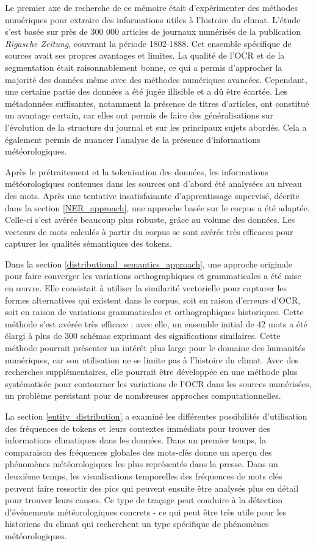 \documentclass[a4paper,twoside,12pt]{article}
\begin{document}
Le premier axe de recherche de ce mémoire était d'expérimenter des méthodes numériques pour extraire des informations utiles à l'histoire du climat. L'étude s'est basée sur près de 300 000 articles de journaux numérisés de la publication \textit{Rigasche Zeitung}, couvrant la période 1802-1888. Cet ensemble spécifique de sources avait ses propres avantages et limites. La qualité de l'OCR et de la segmentation était raisonnablement bonne, ce qui a permis d'approcher la majorité des données même avec des méthodes numériques avancées. Cependant, une certaine partie des données a été jugée illisible et a dû être écartée. Les métadonnées suffisantes, notamment la présence de titres d'articles, ont constitué un avantage certain, car elles ont permis de faire des généralisations sur l'évolution de la structure du journal et sur les principaux sujets abordés. Cela a également permis de nuancer l'analyse de la présence d'informations météorologiques.

Après le prétraitement et la tokenisation des données, les informations météorologiques contenues dans les sources ont d'abord été analysées au niveau des mots. Après une tentative insatisfaisante d'apprentissage supervisé, décrite dans la section \ref{NER_approach}, une approche basée sur le corpus a été adaptée. Celle-ci s'est avérée beaucoup plus robuste, grâce au volume des données. Les vecteurs de mots calculés à partir du corpus se sont avérés très efficaces pour capturer les qualités sémantiques des tokens.

Dans la section \ref{distributional_semantics_approach}, une approche originale pour faire converger les variations orthographiques et grammaticales a été mise en œuvre. Elle consistait à utiliser la similarité vectorielle pour capturer les formes alternatives qui existent dans le corpus, soit en raison d'erreurs d'OCR, soit en raison de variations grammaticales et orthographiques historiques. Cette méthode s'est avérée très efficace : avec elle, un ensemble initial de 42 mots a été élargi à plus de 300 schémas exprimant des significations similaires. Cette méthode pourrait présenter un intérêt plus large pour le domaine des humanités numériques, car son utilisation ne se limite pas à l'histoire du climat. Avec des recherches supplémentaires, elle pourrait être développée en une méthode plus systématisée pour contourner les variations de l'OCR dans les sources numérisées, un problème persistant pour de nombreuses approches computationnelles.

La section \ref{entity_distribution} a examiné les différentes possibilités d'utilisation des fréquences de tokens et leurs contextes immédiats pour trouver des informations climatiques dans les données. Dans un premier temps, la comparaison des fréquences globales des mots-clés donne un aperçu des phénomènes météorologiques les plus représentés dans la presse. Dans un deuxième temps, les visualisations temporelles des fréquences de mots clés peuvent faire ressortir des pics qui peuvent ensuite être analysés plus en détail pour trouver leurs causes. Ce type de traçage peut conduire à la détection d'événements météorologiques concrets - ce qui peut être très utile pour les historiens du climat qui recherchent un type spécifique de phénomènes météorologiques.
\end{document}
